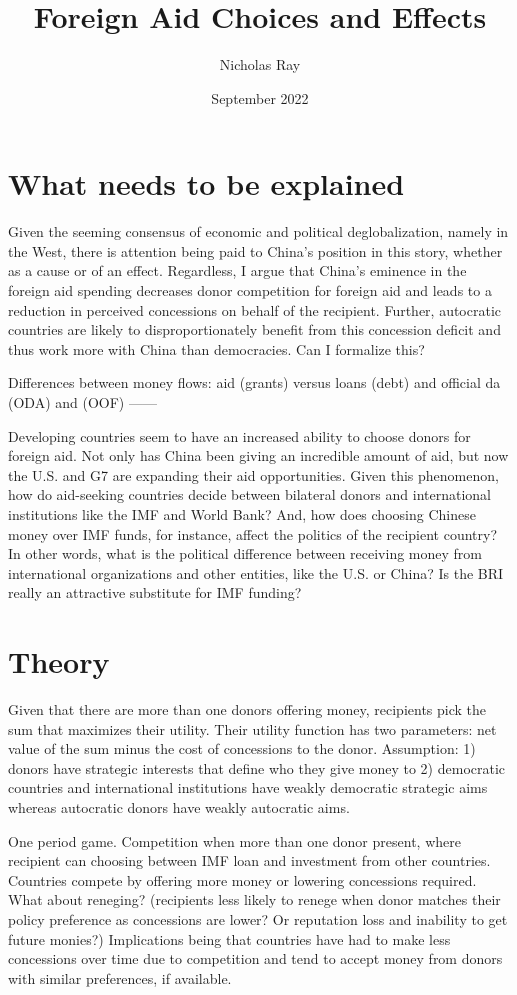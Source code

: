 \documentclass{article}
\title{Foreign Aid Choices and Effects}
\author{Nicholas Ray}
\date{September 2022}
\begin{document}
\maketitle
\section*{What needs to be explained}
Given the seeming consensus of economic and political deglobalization,  namely in the West, there is attention being paid to China's position in this story, whether as a cause or of an effect. Regardless, I argue that China's eminence in the foreign aid spending decreases donor competition for foreign aid and leads to a reduction in perceived concessions on behalf of the recipient. Further, autocratic countries are likely to disproportionately benefit from this concession deficit and thus work more with China than democracies. Can I formalize this?

Differences between money flows: aid (grants) versus loans (debt) and official da (ODA) and (OOF)
------

Developing countries seem to have an increased ability to choose donors for foreign aid. Not only has China been giving an incredible amount of aid, but now the U.S. and G7 are expanding their aid opportunities. Given this phenomenon, how do aid-seeking countries decide between bilateral donors and international institutions like the IMF and World Bank? And, how does choosing Chinese money over IMF funds, for instance, affect the politics of the recipient country? In other words, what is the political difference between receiving money from international organizations and other entities, like the U.S. or China? Is the BRI really an attractive substitute for IMF funding?

\section*{Theory} 
Given that there are more than one donors offering money, recipients pick the sum that maximizes their utility. Their utility function has two parameters: net value of the sum minus the cost of concessions to the donor. Assumption: 1) donors have strategic interests that define who they give money to 2) democratic countries and international institutions have weakly democratic strategic aims whereas autocratic donors have weakly autocratic aims. 

One period game. Competition when more than one donor present, where recipient can choosing between IMF loan and investment from other countries. Countries compete by offering more money or lowering concessions required. What about reneging? (recipients less likely to renege when donor matches their policy preference as concessions are lower? Or reputation loss and inability to get future monies?)  Implications being that countries have had to make less concessions over time due to competition and tend to accept money from donors with similar preferences, if available.
\end{document}
